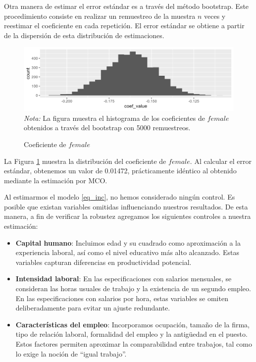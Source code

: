\documentclass[12pt,a4paper,onecolumn]{article}
\begin{document}
Otra manera de estimar el error estándar es a través del método bootstrap. 
Este procedimiento consiste en realizar un remuestreo de la muestra $n$ veces y reestimar el coeficiente en cada repetición. 
El error estándar se obtiene a partir de la dispersión de esta distribución de estimaciones.

\begin{figure}[H]
\caption{Coeficiente de $female$} \label{fig:female}
    \includegraphics[scale=0.75]{../views/sd_fwl_hist.png}   
 \flushleft
 \textit{Nota:} La figura muestra el histograma de los coeficientes de $female$ obtenidos a través del bootstrap con 5000 remuestreos.
\end{figure}

La Figura \ref{fig:female} muestra la distribución del coeficiente de $female$. 
Al calcular el error estándar, obtenemos un valor de 0.01472, prácticamente idéntico al obtenido mediante la estimación por MCO.

Al estimarmos el modelo \ref{eq_inc}, no hemos considerado ningún control. Es posible que existan variables omitidas influenciando nuestros resultados. De esta manera, a fin de verificar la robustez agregamos los siguientes controles a nuestra estimación:
\begin{itemize}
    \item \textbf{Capital humano}: Incluimos edad y su cuadrado como 
    aproximación a la experiencia laboral, así como el nivel educativo más alto 
    alcanzado. Estas variables capturan diferencias en productividad potencial.
    
    \item \textbf{Intensidad laboral}: En las especificaciones con salarios 
    mensuales, se consideran las horas usuales de trabajo y la existencia de un 
    segundo empleo. En las especificaciones con salarios por hora, estas 
    variables se omiten deliberadamente para evitar un ajuste redundante.

    \item \textbf{Características del empleo}: Incorporamos ocupación, tamaño 
    de la firma, tipo de relación laboral, formalidad del empleo y la antigüedad 
    en el puesto. Estos factores permiten aproximar la comparabilidad entre 
    trabajos, tal como lo exige la noción de ``igual trabajo''.

\end{itemize}
\end{document}
